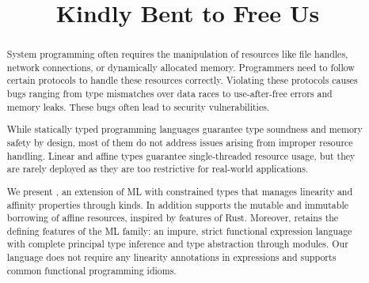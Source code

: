 \documentclass[acmsmall,review,anonymous,table]{acmart}
\begin{document}
\title{Kindly Bent to Free Us}
\begin{abstract}
  System programming often requires the manipulation of resources like
  file handles, network connections, or dynamically allocated
  memory. Programmers need to follow certain protocols to handle
  these resources correctly. Violating these protocols causes bugs
  ranging from type mismatches over data races to use-after-free 
  errors and memory leaks. These bugs often lead to security  vulnerabilities.

  While statically typed programming languages guarantee type soundness and memory 
  safety by design, most of them do not address issues arising
  from improper resource handling. 
  Linear and affine types guarantee single-threaded resource usage,
  but they are rarely deployed as they are too restrictive for real-world applications.

  We present \lang, an extension of ML with constrained types that
  manages linearity and affinity properties through kinds. In addition
  \lang{} supports the mutable and immutable borrowing of affine
  resources, inspired by features of Rust.
  Moreover, \lang{} retains the defining features of the ML family:
  an impure, strict functional expression language with complete principal type
  inference and type abstraction through modules.
  Our language does not require any linearity annotations in
  expressions and supports common functional programming idioms.
\end{abstract}


\maketitle













\clearpage
\appendix

\clearpage

\clearpage


\end{document}
